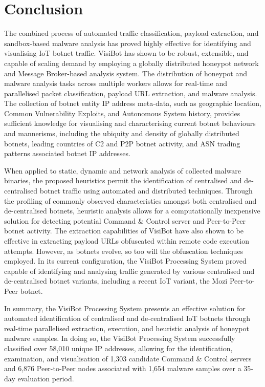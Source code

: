 
\chapter{Conclusion}

The combined process of automated traffic classification, payload extraction, and sandbox-based malware analysis has proved highly effective for identifying and visualising IoT botnet traffic. VisiBot has shown to be robust, extensible, and capable of scaling demand by employing a globally distributed honeypot network and Message Broker-based analysis system. The distribution of honeypot and malware analysis tasks across multiple workers allows for real-time and parallelised packet classification, payload URL extraction, and malware analysis. The collection of botnet entity IP address meta-data, such as geographic location, Common Vulnerability Exploits, and Autonomous System history, provides sufficient knowledge for visualising and characterising current botnet behaviours and mannerisms, including the ubiquity and density of globally distributed botnets, leading countries of C2 and P2P botnet activity, and ASN trading patterns associated botnet IP addresses.

When applied to static, dynamic and network analysis of collected malware binaries, the proposed heuristics permit the identification of centralised and de-centralised botnet traffic using automated and distributed techniques. Through the profiling of commonly observed characteristics amongst both centralised and de-centralised botnets, heuristic analysis allows for a computationally inexpensive solution for detecting potential Command \& Control server and Peer-to-Peer botnet activity. The extraction capabilities of VisiBot have also shown to be effective in extracting payload URLs obfuscated within remote code execution attempts. However, as botnets evolve, so too will the obfuscation techniques employed. In its current configuration, the VisiBot Processing System proved capable of identifying and analysing traffic generated by various centralised and de-centralised botnet variants, including a recent IoT variant, the Mozi Peer-to-Peer botnet. 

In summary, the VisiBot Processing System presents an effective solution for automated identification of centralised and de-centralised IoT botnets through real-time parallelised extraction, execution, and heuristic analysis of honeypot malware samples. In doing so, the VisiBot Processing System successfully classified over 58,010 unique IP addresses, allowing for the identification, examination, and visualisation of 1,303 candidate Command \& Control servers and 6,876 Peer-to-Peer nodes associated with 1,654 malware samples over a 35-day evaluation period.
